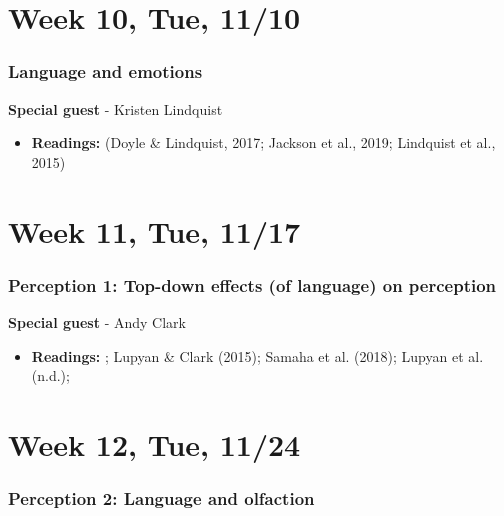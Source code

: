 \documentclass[11pt,man]{article}
\providecommand{\tightlist}{%
  \setlength{\itemsep}{0pt}\setlength{\parskip}{0pt}}
\begin{document}
\hypertarget{week-10-tue-1110}{%
\section{Week 10, Tue, 11/10}\label{week-10-tue-1110}}

\hypertarget{language-and-emotions}{%
\subsubsection{Language and emotions}\label{language-and-emotions}}

\textbf{Special guest} - Kristen Lindquist

\begin{itemize}
\tightlist
\item
  \textbf{Readings:} (Doyle \& Lindquist, 2017; Jackson et al., 2019;
  Lindquist et al., 2015)
\end{itemize}

\hypertarget{week-11-tue-1117}{%
\section{Week 11, Tue, 11/17}\label{week-11-tue-1117}}

\hypertarget{perception-1-top-down-effects-of-language-on-perception}{%
\subsubsection{Perception 1: Top-down effects (of language) on
perception}\label{perception-1-top-down-effects-of-language-on-perception}}

\textbf{Special guest} - Andy Clark

\begin{itemize}
\tightlist
\item
  \textbf{Readings:} ; Lupyan \& Clark (2015); Samaha et al. (2018);
  Lupyan et al. (n.d.);
\end{itemize}

\hypertarget{week-12-tue-1124}{%
\section{Week 12, Tue, 11/24}\label{week-12-tue-1124}}

\hypertarget{perception-2-language-and-olfaction}{%
\subsubsection{Perception 2: Language and
olfaction}\label{perception-2-language-and-olfaction}}
\end{document}
